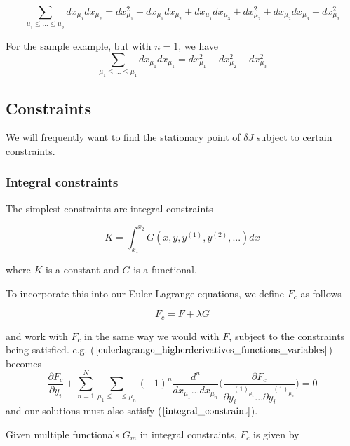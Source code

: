 \documentclass[]{article}
\begin{document}
\begin{equation*} \sum_{\mu_{1} \leq ...\leq \mu_{2}}d x_{\mu_{1}}d x_{\mu_{2}} = d x_{\mu_{1}}^{2} + d x_{\mu_{1}}d x_{\mu_{2}} + d x_{\mu_{1}}d x_{\mu_{3}}+d x_{\mu_{2}}^{2} + d x_{\mu_{2}}d x_{\mu_{3}} + d x_{\mu_{3}}^{2}\end{equation*}

For the sample example, but with $n=1$, we have
\begin{equation*} \sum_{\mu_{1} \leq ...\leq \mu_{1}}d x_{\mu_{1}}d x_{\mu_{1}} = d x_{\mu_{1}}^{2} + d x_{\mu_{2}}^{2} + d x_{\mu_{3}}^{2}\end{equation*}
\subsection{Constraints}
We will frequently want to find the stationary point of $\delta J$ subject to certain constraints. 
\subsubsection{Integral constraints}
The simplest constraints are integral constraints 

\begin{equation} K = \int_{x_{1}}^{x_{2}} G(x, y, y^{(1)},y^{(2)},...) dx \label{integral_constraint}\end{equation}

where $K$ is a constant and $G$ is a functional.

To incorporate this into our Euler-Lagrange equations, we define $F_{c}$ as follows

\begin{equation*} F_{c} = F + \lambda G \end{equation*}

and work with $F_{c}$ in the same way we would with $F$, subject to the constraints being satisfied. e.g. ($\ref{eulerlagrange_higherderivatives_functions_variables}$) becomes
\begin{equation*} \frac{\partial F_{c}}{\partial y_{i}} +  \sum_{n=1}^{N} \sum_{\mu_{1} \leq ...\leq \mu_{n}} (-1)^{n}\frac{d^{n}}{d x_{\mu_{1}}...d x_{\mu_{n}}} \bigg(\frac{\partial F_{c}}{\partial y^{(1)_{\mu_{1}}}_{i} ...\partial y^{(1)_{\mu_{n}}}_{i}}\bigg) = 0 \end{equation*}  
and our solutions must also satisfy ($\ref{integral_constraint}$).

Given multiple functionals $G_{m}$ in integral constraints, $F_{c}$ is given by
\end{document}
